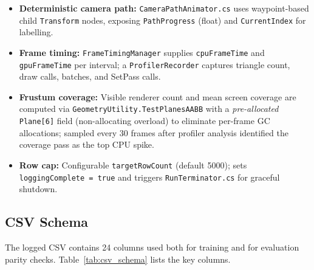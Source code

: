 \documentclass[12pt, a4paper]{article}
\begin{document}
\begin{itemize}
  \item \textbf{Deterministic camera path:} \texttt{CameraPathAnimator.cs} uses
    waypoint-based child \texttt{Transform} nodes, exposing \texttt{PathProgress}
    (float) and \texttt{CurrentIndex} for labelling.
  \item \textbf{Frame timing:} \texttt{FrameTimingManager} supplies
    \texttt{cpuFrameTime} and \texttt{gpuFrameTime} per interval; a
    \texttt{ProfilerRecorder} captures triangle count, draw calls, batches, and
    SetPass calls.
  \item \textbf{Frustum coverage:} Visible renderer count and mean screen coverage
    are computed via \texttt{GeometryUtility.TestPlanesAABB} with a
    \emph{pre-allocated} \texttt{Plane[6]} field (non-allocating overload) to
    eliminate per-frame GC allocations; sampled every 30 frames after profiler
    analysis identified the coverage pass as the top CPU spike.
  \item \textbf{Row cap:} Configurable \texttt{targetRowCount} (default 5000);
    sets \texttt{loggingComplete = true} and triggers \texttt{RunTerminator.cs}
    for graceful shutdown.
\end{itemize}

\subsection{CSV Schema}

The logged CSV contains 24 columns used both for training and for evaluation
parity checks. Table~\ref{tab:csv_schema} lists the key columns.
\end{document}
